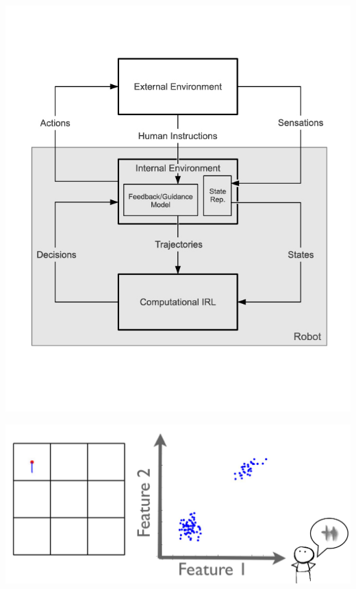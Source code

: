 \documentclass[a0,final, portrait]{inriaposter}
\begin{document}
\begin{multicols}{2}
{
\begin{center}
\begin{minipage}{.46\columnwidth}
	\begin{center}
		\includegraphics[width=\columnwidth, trim=0cm 0cm 0cm 3cm, clip=true]{images/problem_representation}
	\end{center}
\end{minipage}
\begin{minipage}{.02\columnwidth}
	\begin{center}

	\end{center}
\end{minipage}
\begin{minipage}{.46\columnwidth}
	\begin{center}
		\includegraphics[width=\columnwidth, trim=0cm 0cm 8cm 0cm, clip=true]{images/exemple.png}
	\end{center}
\end{minipage}
\end{center}
\vspace{-2cm}

}
\end{multicols}
\end{document}
